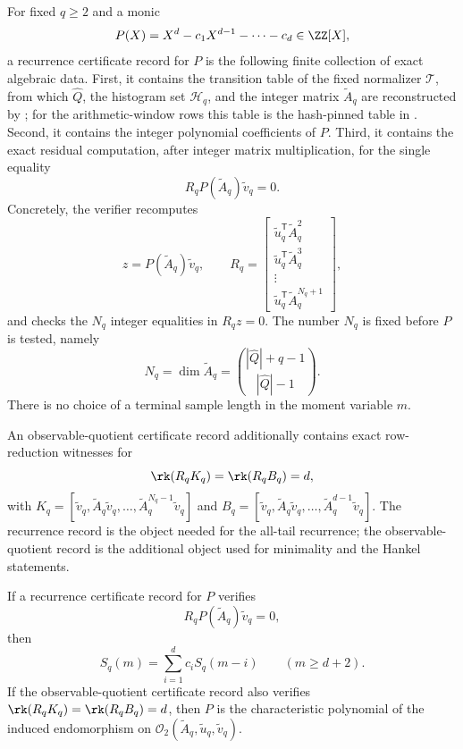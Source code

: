 \begin{definition}
\label{def:finite-recurrence-certificate-record}
For fixed \(q\ge2\) and a monic
\[
  P(X)=X^d-c_1X^{d-1}-\cdots-c_d\in\ZZ[X],
\]
a recurrence certificate record for \(P\) is the following finite collection of
exact algebraic data.
First, it contains the transition table of the fixed normalizer
\(\mathcal T\), from which \(\widehat Q\), the histogram set \(\mathcal H_q\),
and the integer matrix \(\widetilde A_q\) are reconstructed by
; for the arithmetic-window rows this table is
the hash-pinned table in
.  Second, it contains the
integer polynomial
coefficients of \(P\).  Third, it contains the exact residual computation,
after integer matrix multiplication, for the single equality
\[
  R_qP(\widetilde A_q)\widetilde v_q=0.
\]
Concretely, the verifier recomputes
\[
  z=P(\widetilde A_q)\widetilde v_q,\qquad
  R_q=
  \begin{bmatrix}
  \widetilde u_q^{\mathsf T}\widetilde A_q^2\\
  \widetilde u_q^{\mathsf T}\widetilde A_q^3\\
  \vdots\\
  \widetilde u_q^{\mathsf T}\widetilde A_q^{N_q+1}
  \end{bmatrix},
\]
and checks the \(N_q\) integer equalities in \(R_qz=0\).  The number \(N_q\) is
fixed before \(P\) is tested, namely
\[
  N_q=\dim\widetilde A_q=\binom{|\widehat Q|+q-1}{|\widehat Q|-1}.
\]
There is no choice of a terminal sample length in the moment variable \(m\).

An observable-quotient certificate record additionally contains exact
row-reduction witnesses for
\[
  \rk(R_qK_q)=\rk(R_qB_q)=d,
\]
with \(K_q=[\widetilde v_q,\widetilde A_q\widetilde v_q,\dots,
\widetilde A_q^{N_q-1}\widetilde v_q]\) and
\(B_q=[\widetilde v_q,\widetilde A_q\widetilde v_q,\dots,
\widetilde A_q^{d-1}\widetilde v_q]\).
The recurrence record is the object needed for the all-tail recurrence; the
observable-quotient record is the additional object used for minimality and the
Hankel statements.
\end{definition}

\begin{lemma}
\label{lem:finite-certificate-record-soundness}
If a recurrence certificate record for \(P\) verifies
\[
  R_qP(\widetilde A_q)\widetilde v_q=0,
\]
then
\[
  S_q(m)=\sum_{i=1}^d c_iS_q(m-i)\qquad(m\ge d+2).
\]
If the observable-quotient certificate record also verifies
\(\rk(R_qK_q)=\rk(R_qB_q)=d\), then \(P\) is the characteristic polynomial of
the induced endomorphism on
\(\mathcal O_2(\widetilde A_q,\widetilde u_q,\widetilde v_q)\).
\end{lemma}


